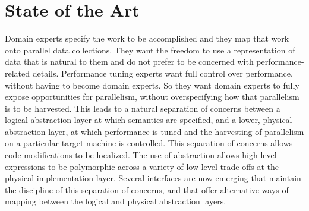 \section{State of the Art}
Domain experts specify the work to be accomplished and they map that
work onto parallel data collections.  They want the freedom to use a
representation of data that is natural to them and do not prefer to be
concerned with performance-related details.  Performance tuning
experts want full control over performance, without having to become
domain experts.  So they want domain experts to fully expose
opportunities for parallelism, without overspecifying how that
parallelism is to be harvested.  This leads to a natural separation of
concerns between a logical abstraction layer at which semantics are
specified, and a lower, physical abstraction layer, at which
performance is tuned and the harvesting of parallelism on a particular
target machine is controlled.  This separation of concerns allows code
modifications to be localized.  The use of abstraction allows
high-level expressions to be polymorphic across a variety of low-level
trade-offs at the physical implementation layer.  Several interfaces
are now emerging that maintain the discipline of this separation of
concerns, and that offer alternative ways of mapping between the
logical and physical abstraction layers. 

